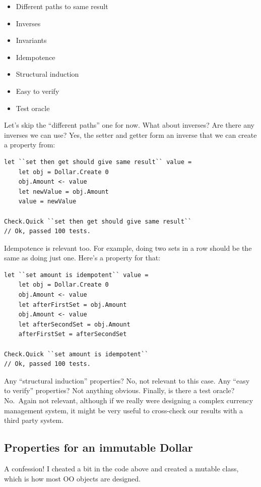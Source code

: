\begin{itemize}
\item
  Different paths to same result
\item
  Inverses
\item
  Invariants
\item
  Idempotence
\item
  Structural induction
\item
  Easy to verify
\item
  Test oracle
\end{itemize}

Let's skip the ``different paths'' one for now. What about inverses? Are
there any inverses we can use?
Yes, the setter and getter form an inverse that we can create a property
from:

\begin{verbatim}
let ``set then get should give same result`` value = 
	let obj = Dollar.Create 0
	obj.Amount <- value
	let newValue = obj.Amount
	value = newValue 

Check.Quick ``set then get should give same result`` 
// Ok, passed 100 tests.
\end{verbatim}
Idempotence is relevant too. For example, doing two sets in a row should
be the same as doing just one. Here's a property for that:

\begin{verbatim}
let ``set amount is idempotent`` value = 
	let obj = Dollar.Create 0
	obj.Amount <- value
	let afterFirstSet = obj.Amount
	obj.Amount <- value
	let afterSecondSet = obj.Amount
	afterFirstSet = afterSecondSet 

Check.Quick ``set amount is idempotent`` 
// Ok, passed 100 tests.
\end{verbatim}
Any ``structural induction'' properties? No, not relevant to this case.
Any ``easy to verify'' properties? Not anything obvious.
Finally, is there a test oracle? No.~Again not relevant, although if we
really were designing a complex currency management system, it might be
very useful to cross-check our results with a third party system.

\subsection{Properties for an immutable
Dollar}
\label{properties-for-an-immutable-dollar}

A confession! I cheated a bit in the code above and created a mutable
class, which is how most OO objects are designed.

